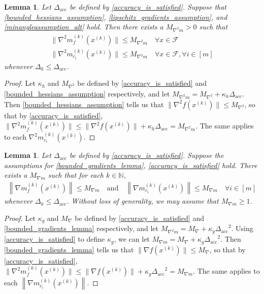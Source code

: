 \documentclass{article}
\newtheorem{lemma}[theorem]{Lemma}
\theoremstyle{case}
\numberwithin{theorem}{subsection}
\newcommand{\dacc}{{\Delta_{\textrm{acc}}}}
\newcommand{\dk}{\Delta_k}
\newcommand{\feasible}{{\mathcal F}}
\newcommand{\gk}{{\nabla m_f^{(k)}\left(\xk\right)}}
\newcommand{\gmcik}{{\nabla m_{c_i}^{(k)}\left(\xk\right)}}
\newcommand{\hk}{{\nabla^2m_f^{(k)}\left(\xk\right)}}
\newcommand{\maxgrad}{{M_{\nabla}}}
\newcommand{\maxhessian}{{M_{\nabla^2}}}
\newcommand{\maxmodelhessian}{{M_{\nabla^2 m}}}
\newcommand{\naturals}{\mathbb N}
\newcommand{\xk}{x^{(k)}}
\newcommand{\maxmodelgrad}{{M_{\nabla m}}}
\begin{document}
\begin{lemma}
\label{bounded_model_hessian_lemma}
Let $\dacc$ be defined by \cref{accuracy_is_satisfied}.
Suppose that \cref{bounded_hessians_assumption}, \cref{lipschitz_gradients_assumption}, and \cref{minangleassumption_alt} hold.
Then there exists a $\maxmodelhessian > 0$ such that 
\begin{align*}
\| \hk \| \le \maxmodelhessian \quad \forall x \in \feasible \\
\|\nabla^2 m_{c_i}^{(k)}(\xk) \| \le \maxmodelhessian \quad \forall x \in \feasible, \forall i \in [m]
\end{align*}
whenever $\dk \le \dacc$.
\end{lemma}

\begin{proof}
Let $\kappa_h$ and $\maxhessian$ be defined by \cref{accuracy_is_satisfied} and \cref{bounded_hessians_assumption} respectively,
and let $\maxmodelhessian = \maxhessian + \kappa_h \dacc$.
Then \cref{bounded_hessians_assumption} tells us that
$\|\nabla^2 f(\xk)\| \le \maxhessian$, so that by \cref{accuracy_is_satisfied},
$\|\hk\| \le \|\nabla^2 f(\xk)\| + \kappa_h\dacc = \maxmodelhessian$.
The same applies to each $\nabla^2 m_{c_i}^{(k)}(\xk)$.
\end{proof}

\begin{lemma}
\label{i_thought_i_proved_this_already}
Let $\dacc$ be defined by \cref{accuracy_is_satisfied}.
Suppose the assumptions for
\cref{bounded_gradients_lemma},
\cref{accuracy_is_satisfied}
hold.
There exists a $\maxmodelgrad$ such that for each $k \in \naturals$, 
\begin{align*}
\left\| \gk \right\| \le \maxmodelgrad \quad
\textrm{and} \quad \left\|\gmcik\right\| \le \maxmodelgrad \quad \forall i \in [m]
\end{align*}
whenever $\dk \le \dacc$.
Without loss of generality, we may assume that $\maxmodelgrad \ge 1$.
\end{lemma}
\begin{proof}
Let $\kappa_g$ and $\maxgrad$ be defined by \cref{accuracy_is_satisfied} and \cref{bounded_gradients_lemma} respectively,
and let $\maxmodelhessian = \maxgrad + \kappa_g \dacc^2$.
Using \cref{accuracy_is_satisfied} to define $\kappa_g$, we can let $\maxmodelgrad = \maxgrad + \kappa_g \dacc^2$.
Then \cref{bounded_gradients_lemma} tells us that
$\|\nabla f(\xk)\| \le \maxgrad$, so that by \cref{accuracy_is_satisfied},
$\|\hk\| \le \|\nabla f(\xk)\| + \kappa_g\dacc^2 = \maxmodelgrad$.
The same applies to each $\left\|\gmcik\right\|$.
\end{proof}
\end{document}
